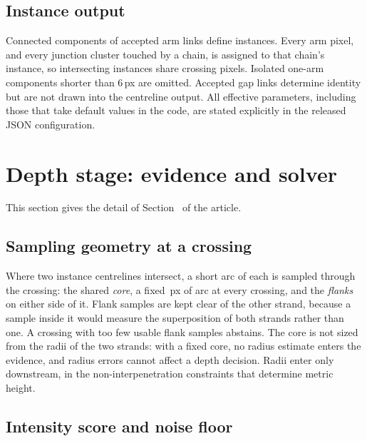 \subsection{Instance output}

Connected components of accepted arm links define instances. Every arm pixel,
and every junction cluster touched by a chain, is assigned to that chain's
instance, so intersecting instances share crossing pixels. Isolated one-arm
components shorter than 6\,px are omitted. Accepted gap links determine
identity but are not drawn into the centreline output. All effective
parameters, including those that take default values in the code, are stated explicitly in the
released JSON configuration.

\section{Depth stage: evidence and solver}
\label{supp:depthstage}

This section gives the detail of Section~ of the
article.

\subsection{Sampling geometry at a crossing}

Where two instance centrelines intersect, a short arc of each is sampled
through the crossing: the shared \emph{core}, a fixed \PlectaParamCorePx{}\,px
of arc at every crossing, and the \emph{flanks} on either side of it. Flank
samples are kept clear of the other strand, because a sample inside it would
measure the superposition of both strands rather than one. A crossing with too
few usable flank samples abstains. The core is not sized from the radii of
the two strands: with a fixed core, no radius estimate enters the
evidence, and radius errors cannot affect a depth decision. Radii enter only
downstream, in the non-interpenetration constraints that determine metric
height.

\subsection{Intensity score and noise floor}

